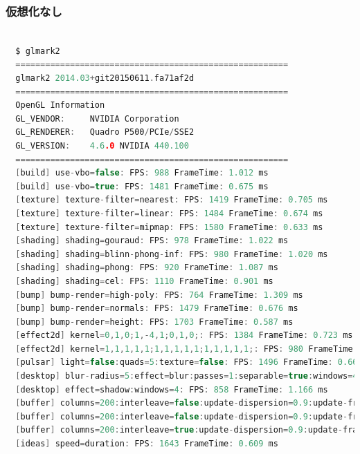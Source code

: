 \documentclass[onecolumn]{preport}
\begin{document}
\subsubsection{仮想化なし}
\begin{lstlisting}[language=c]

  $ glmark2
  =======================================================
  glmark2 2014.03+git20150611.fa71af2d
  =======================================================
  OpenGL Information
  GL_VENDOR:     NVIDIA Corporation
  GL_RENDERER:   Quadro P500/PCIe/SSE2
  GL_VERSION:    4.6.0 NVIDIA 440.100
  =======================================================
  [build] use-vbo=false: FPS: 988 FrameTime: 1.012 ms
  [build] use-vbo=true: FPS: 1481 FrameTime: 0.675 ms
  [texture] texture-filter=nearest: FPS: 1419 FrameTime: 0.705 ms
  [texture] texture-filter=linear: FPS: 1484 FrameTime: 0.674 ms
  [texture] texture-filter=mipmap: FPS: 1580 FrameTime: 0.633 ms
  [shading] shading=gouraud: FPS: 978 FrameTime: 1.022 ms
  [shading] shading=blinn-phong-inf: FPS: 980 FrameTime: 1.020 ms
  [shading] shading=phong: FPS: 920 FrameTime: 1.087 ms
  [shading] shading=cel: FPS: 1110 FrameTime: 0.901 ms
  [bump] bump-render=high-poly: FPS: 764 FrameTime: 1.309 ms
  [bump] bump-render=normals: FPS: 1479 FrameTime: 0.676 ms
  [bump] bump-render=height: FPS: 1703 FrameTime: 0.587 ms
  [effect2d] kernel=0,1,0;1,-4,1;0,1,0;: FPS: 1384 FrameTime: 0.723 ms
  [effect2d] kernel=1,1,1,1,1;1,1,1,1,1;1,1,1,1,1;: FPS: 980 FrameTime: 1.020 ms
  [pulsar] light=false:quads=5:texture=false: FPS: 1496 FrameTime: 0.668 ms
  [desktop] blur-radius=5:effect=blur:passes=1:separable=true:windows=4: FPS: 695 FrameTime: 1.439 ms
  [desktop] effect=shadow:windows=4: FPS: 858 FrameTime: 1.166 ms
  [buffer] columns=200:interleave=false:update-dispersion=0.9:update-fraction=0.5:update-method=map: FPS: 425 FrameTime: 2.353 ms
  [buffer] columns=200:interleave=false:update-dispersion=0.9:update-fraction=0.5:update-method=subdata: FPS: 627 FrameTime: 1.595 ms
  [buffer] columns=200:interleave=true:update-dispersion=0.9:update-fraction=0.5:update-method=map: FPS: 570 FrameTime: 1.754 ms
  [ideas] speed=duration: FPS: 1643 FrameTime: 0.609 ms

\end{lstlisting}
\end{document}
